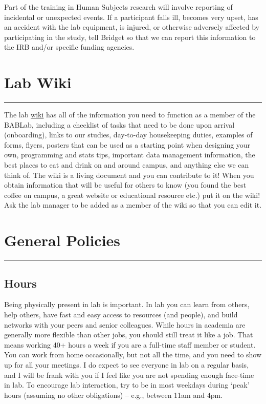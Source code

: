 \documentclass[]{book}
\begin{document}
Part of the training in Human Subjects research will involve reporting of incidental or unexpected events. If a participant falls ill, becomes very upset, has an accident with the lab equipment, is injured, or otherwise adversely affected by participating in the study, tell Bridget so that we can report this information to the IRB and/or specific funding agencies.

\hypertarget{lab-wiki}{%
\chapter{Lab Wiki}\label{lab-wiki}}

\begin{center}\rule{0.5\linewidth}{0.5pt}\end{center}

The lab \href{https://bablab.github.io/wiki_bablab/}{wiki} has all of the information you need to function as a member of the BABLab, including a checklist of tasks that need to be done upon arrival (onboarding), links to our studies, day-to-day housekeeping duties, examples of forms, flyers, posters that can be used as a starting point when designing your own, programming and stats tips, important data management information, the best places to eat and drink on and around campus, and anything else we can think of. The wiki is a living document and you can contribute to it! When you obtain information that will be useful for others to know (you found the best coffee on campus, a great website or educational resource etc.) put it on the wiki! Ask the lab manager to be added as a member of the wiki so that you can edit it.

\hypertarget{general-policies}{%
\chapter{General Policies}\label{general-policies}}

\begin{center}\rule{0.5\linewidth}{0.5pt}\end{center}

\hypertarget{hours}{%
\section{Hours}\label{hours}}

Being physically present in lab is important. In lab you can learn from others, help others, have fast and easy access to resources (and people), and build networks with your peers and senior colleagues. While hours in academia are generally more flexible than other jobs, you should still treat it like a job. That means working 40+ hours a week if you are a full-time staff member or student. You can work from home occasionally, but not all the time, and you need to show up for all your meetings. I do expect to see everyone in lab on a regular basis, and I will be frank with you if I feel like you are not spending enough face-time in lab. To encourage lab interaction, try to be in most weekdays during `peak' hours (assuming no other obligations) -- e.g., between 11am and 4pm.
\end{document}
